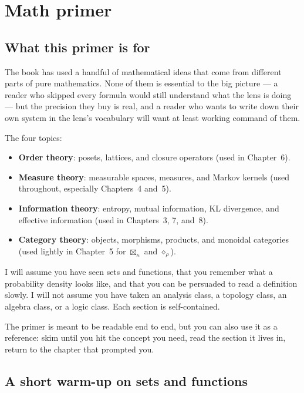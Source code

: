 \chapter{Math primer}

\section{What this primer is for}

The book has used a handful of mathematical ideas that come from
different parts of pure mathematics. None of them is essential to the
big picture --- a reader who skipped every formula would still
understand what the lens is doing --- but the precision they buy is
real, and a reader who wants to write down their own system in the
lens's vocabulary will want at least working command of them.

The four topics:

\begin{itemize}[leftmargin=1.5em,itemsep=2pt]
  \item \textbf{Order theory}: posets, lattices, and closure
    operators (used in Chapter~6).
  \item \textbf{Measure theory}: measurable spaces, measures, and
    Markov kernels (used throughout, especially Chapters~4 and~5).
  \item \textbf{Information theory}: entropy, mutual information, KL
    divergence, and effective information (used in Chapters~3, 7,
    and~8).
  \item \textbf{Category theory}: objects, morphisms, products, and
    monoidal categories (used lightly in Chapter~5 for
    $\boxtimes_\kappa$ and $\diamond_\rho$).
\end{itemize}

I will assume you have seen sets and functions, that you remember
what a probability density looks like, and that you can be persuaded
to read a definition slowly. I will not assume you have taken an
analysis class, a topology class, an algebra class, or a logic class.
Each section is self-contained.

The primer is meant to be readable end to end, but you can also use
it as a reference: skim until you hit the concept you need, read the
section it lives in, return to the chapter that prompted you.

\section{A short warm-up on sets and functions}

